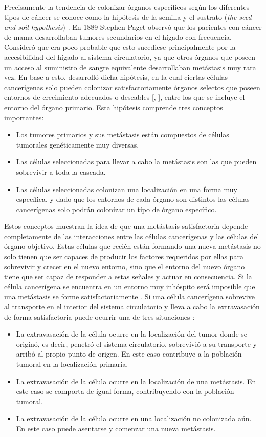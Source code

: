 \hspace{.1cm}Precisamente la tendencia de colonizar órganos específicos según los diferentes tipos de cáncer se conoce como la hipótesis de la semilla y el sustrato (\textit{the seed and soil hypothesis}) \cite{paget}. En 1889 Stephen Paget observó que los pacientes con cáncer de mama desarrollaban tumores secundarios en el hígado con frecuencia. Consideró que era poco probable que esto sucediese principalmente por la accesibilidad del hígado al sistema circulatorio, ya que otros órganos que poseen un acceso al suministro de sangre equivalente desarrollaban metástasis muy rara vez. En base a esto, desarrolló dicha hipótesis, en la cual ciertas células cancerígenas solo pueden colonizar satisfactoriamente órganos selectos que poseen entornos de crecimiento adecuados o deseables [\cite{paget}, \cite{metastasis}], entre los que se incluye el entorno del órgano primario. Esta hipótesis comprende tres conceptos importantes:
\begin{itemize}
    \item Los tumores primarios y sus metástasis están compuestos de células tumorales genéticamente muy diversas.
    \item Las células seleccionadas para llevar a cabo la metástasis son las que pueden sobrevivir a toda la cascada.
    \item Las células seleccionadas colonizan una localización en una forma muy específica, y dado que los entornos de cada órgano son distintos las células cancerígenas solo podrán colonizar un tipo de órgano específico.
\end{itemize}

Estos conceptos muestran la idea de que una metástasis satisfactoria depende completamente de las interacciones entre las células cancerígenas y las células del órgano objetivo. Estas células que recién están formando una nueva metástasis no solo tienen que ser capaces de producir los factores requeridos por ellas para sobrevivir y crecer en el nuevo entorno, sino que el entorno del nuevo órgano tiene que ser capaz de responder a estas señales y actuar en consecuencia. Si la célula cancerígena se encuentra en un entorno muy inhóspito será imposible que una metástasis se forme satisfactoriamente \cite{metastasis}. Si una célula cancerígena sobrevive al transporte en el interior del sistema circulatorio y lleva a cabo la extravasación de forma satisfactoria puede ocurrir una de tres situaciones \cite{circulating}:
\begin{itemize}
    \item La extravasación de la célula ocurre en la localización del tumor donde se originó, es decir, penetró el sistema circulatorio, sobrevivió a su transporte y arribó al propio punto de origen. En este caso contribuye a la población tumoral en la localización primaria.
    \item La extravasación de la célula ocurre en la localización de una metástasis. En este caso se comporta de igual forma, contribuyendo con la población tumoral.
    \item La extravasación de la célula ocurre en una localización no colonizada aún. En este caso puede asentarse y comenzar una nueva metástasis.
\end{itemize}